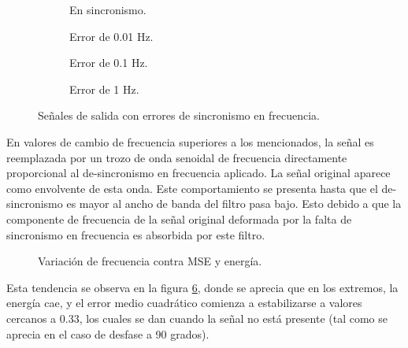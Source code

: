 \begin{figure}[H]
	\centering
	\begin{subfigure}[b]{0.49\linewidth}
		\def\svgwidth{5cm}
		
		\caption{\scriptsize En sincronismo.}
		\label{subfig:DFreq0}
	\end{subfigure}
	\begin{subfigure}[b]{0.49\linewidth}
		\def\svgwidth{5cm}
		
		\caption{\scriptsize Error de 0.01 Hz.}
		\label{subfig:DFreq001}
	\end{subfigure}
	\begin{subfigure}[b]{0.49\linewidth}
		\def\svgwidth{5cm}
		
		\caption{\scriptsize Error de 0.1 Hz.}
		\label{subfig:DFreq01}
	\end{subfigure}
	\begin{subfigure}[b]{0.49\linewidth}
		\def\svgwidth{5cm}
		
		\caption{\scriptsize Error de 1 Hz.}
		\label{subfig:DFreq1}
	\end{subfigure}
	\vspace{-3mm}
	\caption{\scriptsize Señales de salida con errores de sincronismo en frecuencia.}
	\label{fig:graficasfreq}
	\vspace{-5mm}
\end{figure}

En valores de cambio de frecuencia superiores a los mencionados, la señal es reemplazada por un trozo de onda senoidal de frecuencia directamente proporcional al de-sincronismo en frecuencia aplicado. La señal original aparece como envolvente de esta onda. Este comportamiento se presenta hasta que el de-sincronismo es mayor al ancho de banda del filtro pasa bajo. Esto debido a que la componente de frecuencia de la señal original deformada por la falta de sincronismo en frecuencia es absorbida por este filtro.
\begin{figure}[H]
	\centering
	\def\svgwidth{8.8cm}
	\tiny
	\caption{\scriptsize Variación de frecuencia contra MSE y energía.}
	\vspace{-3mm}
	\label{fig:erroresFreucencia}
\end{figure}
Esta tendencia se observa en la figura \ref{fig:erroresFreucencia}, donde se aprecia que en los extremos, la energía cae, y el error medio cuadrático comienza a estabilizarse a valores cercanos a 0.33, los cuales se dan cuando la señal no está presente (tal como se aprecia en el caso de desfase a 90 grados).


